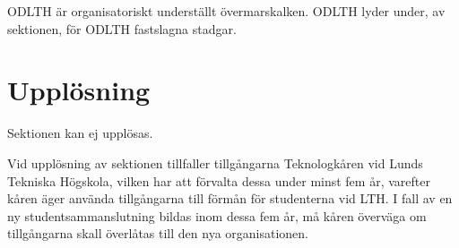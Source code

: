 \documentclass[stadgar]{dsekprotokoll}
\begin{document}
\begin{stadgeavsnitt}


ODLTH är organisatoriskt underställt övermarskalken. ODLTH lyder under, av
sektionen, för ODLTH fastslagna stadgar.

\end{stadgeavsnitt}

\section{Upplösning}

\begin{stadgeavsnitt}


Sektionen kan ej upplösas.


Vid upplösning av sektionen tillfaller tillgångarna Teknologkåren vid Lunds
Tekniska Högskola, vilken har att förvalta dessa under minst fem år,
varefter kåren äger använda tillgångarna till förmån för studenterna vid
LTH. I fall av en ny studentsammanslutning bildas inom dessa fem år, må
kåren överväga om tillgångarna skall överlåtas till den nya organisationen.

\end{stadgeavsnitt}
\end{document}
